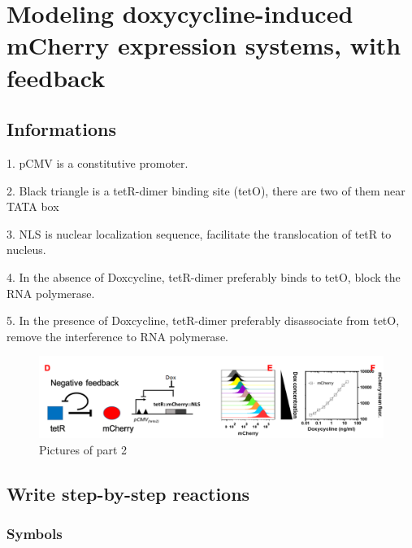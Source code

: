 \chapter{Modeling doxycycline-induced mCherry expression systems, with feedback} %

\label{Part2_chapter} %



\section{Informations}

1. pCMV is a constitutive promoter.

2. Black triangle is a tetR-dimer binding site (tetO), there are two of them near TATA box

3. NLS is nuclear localization sequence, facilitate the translocation of tetR to nucleus.

4. In the absence of Doxcycline, tetR-dimer preferably binds to tetO, block the RNA polymerase.

5. In the presence of Doxcycline, tetR-dimer preferably disassociate from tetO, remove the interference to RNA polymerase.

\begin{figure}[th]
\centering
\includegraphics[width=1.0\linewidth]{Figures/part2.png}
\caption{Pictures of part 2}
\label{part_2_qestion_figure}
\end{figure}
\section{Write step-by-step reactions}

\subsection{Symbols}


